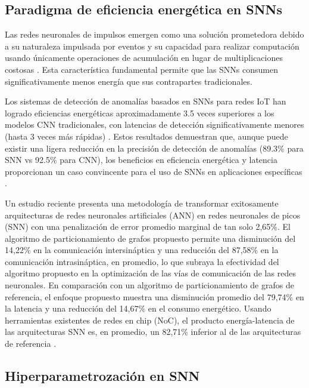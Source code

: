\subsection{Paradigma de eficiencia energética en SNNs}

Las redes neuronales de impulsos emergen como una solución prometedora debido a su naturaleza impulsada por eventos y su capacidad para realizar computación usando únicamente operaciones de acumulación en lugar de multiplicaciones costosas \cite{jang_bisnn_2021}. Esta característica fundamental permite que las SNNs consumen significativamente menos energía que sus contrapartes tradicionales.

Los sistemas de detección de anomalías basados en SNNs para redes IoT han logrado eficiencias energéticas aproximadamente 3.5 veces superiores a los modelos CNN tradicionales, con latencias de detección significativamente menores (hasta 3 veces más rápidas) \cite{maddula_ai-driven_2024}. Estos resultados demuestran que, aunque puede existir una ligera reducción en la precisión de detección de anomalías (89.3\% para SNN vs 92.5\% para CNN), los beneficios en eficiencia energética y latencia proporcionan un caso convincente para el uso de SNNs en aplicaciones específicas \cite{maddula_ai-driven_2024}.

Un estudio reciente presenta una metodología de transformar exitosamente arquitecturas de redes neuronales artificiales (ANN) en redes neuronales de picos (SNN) con una penalización de error promedio marginal de tan solo 2,65\%. El algoritmo de particionamiento de grafos propuesto permite una disminución del 14,22\% en la comunicación intersináptica y una reducción del 87,58\% en la comunicación intrasináptica, en promedio, lo que subraya la efectividad del algoritmo propuesto en la optimización de las vías de comunicación de las redes neuronales. En comparación con un algoritmo de particionamiento de grafos de referencia, el enfoque propuesto muestra una disminución promedio del 79,74\% en la latencia y una reducción del 14,67\% en el consumo energético. Usando herramientas existentes de redes en chip (NoC), el producto energía-latencia de las arquitecturas SNN es, en promedio, un 82,71\% inferior al de las arquitecturas de referencia \cite{islam_benchmarking_2024}.

\subsection{Hiperparametrozación en SNN}

